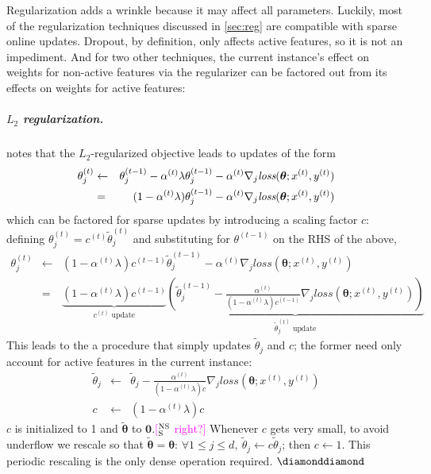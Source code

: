 \documentclass[11pt,letterpaper]{article}
\newcommand{\ensuretext}[1]{#1}
\newcommand{\nssmarker}{\ensuretext{\textcolor{magenta}{\ensuremath{^{\textsc{NS}}_{\textsc{S}}}}}}
\newcommand{\arkcomment}[3]{\ensuretext{\textcolor{#3}{[#1 #2]}}}
\newcommand{\nss}[1]{\arkcomment{\nssmarker}{#1}{magenta}}
\begin{document}
Regularization adds a wrinkle because it may affect all parameters.
Luckily, most of the regularization techniques discussed in \cref{sec:reg} are compatible with sparse online updates.
Dropout, by definition, only affects active features, so it is not an impediment. 
And for two other techniques, the current instance's effect on weights for non-active features via the regularizer  
can be factored out from its effects on weights for active features:

\subparagraph{$L_2$ regularization.}
 notes that the $L_2$-regularized objective leads to updates of the form
\begin{eqnarray*}
\theta^{(t)}_j & \leftarrow & \theta^{(t-1)}_j - \alpha^{(t)}\lambda\theta^{(t-1)}_j - \alpha^{(t)}\nabla_j\textit{loss}(\boldsymbol{\theta}; x^{(t)}, y^{(t)}) \\
						& = & \hspace{1.25em}(1 - \alpha^{(t)}\lambda)\theta^{(t-1)}_j - \alpha^{(t)}\nabla_j\textit{loss}(\boldsymbol{\theta}; x^{(t)}, y^{(t)})
\end{eqnarray*}
which can be factored for sparse updates by introducing a scaling factor $c$: 
defining $\theta^{(t)}_j = c^{(t)}\tilde{\theta}^{(t)}_j$ and substituting for $\theta^{(t-1)}$ on the RHS of the above,
\begin{eqnarray*}
\theta^{(t)}_j & \leftarrow & 
                  (1 - \alpha^{(t)}\lambda)c^{(t-1)}\tilde{\theta}^{(t-1)}_j - \alpha^{(t)}\nabla_j\textit{loss}(\boldsymbol{\theta}; x^{(t)}, y^{(t)}) \\
& = & \underbrace{(1 - \alpha^{(t)}\lambda)c^{(t-1)}}_{c^{(t)}\textrm{ update}}\underbrace{\left(\tilde{\theta}^{(t-1)}_j - \frac{\alpha^{(t)}}{(1 - \alpha^{(t)}\lambda)c^{(t-1)}}\nabla_j\textit{loss}(\boldsymbol{\theta}; x^{(t)}, y^{(t)})\right)}_{\tilde{\theta}^{(t)}_j\textrm{ update}}
\end{eqnarray*}
This leads to the a procedure that simply updates $\tilde{\theta}_j$ and $c$; 
the former need only account for active features in the current instance: 
\begin{eqnarray}
\tilde{\theta}_j & \leftarrow & \tilde{\theta}_j - \frac{\alpha^{(t)}}{(1 - \alpha^{(t)}\lambda)c}\nabla_j\textit{loss}(\boldsymbol{\theta}; x^{(t)}, y^{(t)}) \\
c & \leftarrow & (1 - \alpha^{(t)}\lambda)c
\end{eqnarray}
$c$ is initialized to 1 and $\tilde{\boldsymbol{\theta}}$ to $\mathbf{0}$.\nss{right?} 
Whenever $c$ gets very small, to avoid underflow we rescale so that $\tilde{\boldsymbol{\theta}}=\boldsymbol{\theta}$: 
$\forall 1\leq j\leq d,~ \tilde{\theta}_j \leftarrow c\tilde{\theta}_j$; then $c \leftarrow 1$. 
This periodic rescaling is the only dense operation required. $\diamonddiamond$
\end{document}
